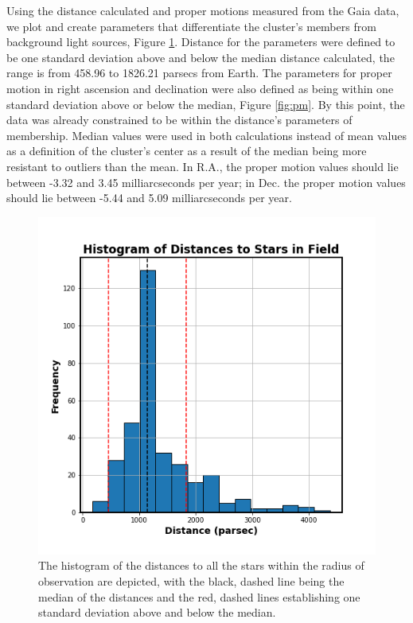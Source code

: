\documentclass[linenumbers]{aastex631}
\begin{document}
Using the distance calculated and proper motions measured from the Gaia data, we plot and create parameters that differentiate the cluster's members from background light sources, Figure \ref{fig:histo}. Distance for the parameters were defined to be one standard deviation above and below the median distance calculated, the range is from 458.96 to 1826.21 parsecs from Earth. The parameters for proper motion in right ascension and declination were also defined as being within one standard deviation above or below the median, Figure \ref{fig:pm}. By this point, the data was already constrained to be within the distance's parameters of membership. Median values were used in both calculations instead of mean values as a definition of the cluster's center as a result of the median being more resistant to outliers than the mean. In R.A., the proper motion values should lie between -3.32 and 3.45 milliarcseconds per year; in Dec. the proper motion values should lie between -5.44 and 5.09 milliarcseconds per year.
\begin{figure}
    \centering
    \includegraphics[scale = 0.5]{pngs/hist_to_dists.png}
    \caption{\label{fig:histo} The histogram of the distances to all the stars within the radius of observation are depicted, with the black, dashed line being the median of the distances and the red, dashed lines establishing one standard deviation above and below the median.}
    \label{fig:histo}
\end{figure}
\end{document}
